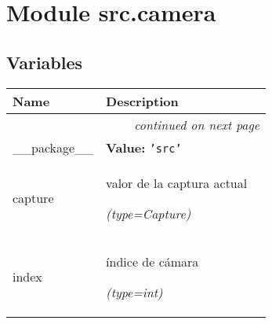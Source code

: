 %
%
%


\section{Module src.camera}

    \label{src:camera}


  \subsection{Variables}

    \vspace{-1cm}
\hspace{\varindent}\begin{longtable}{|p{\varnamewidth}|p{\vardescrwidth}|l}
\cline{1-2}
\cline{1-2} \centering \textbf{Name} & \centering \textbf{Description}& \\
\cline{1-2}
\endhead\cline{1-2}\multicolumn{3}{r}{\small\textit{continued on next page}}\\\endfoot\cline{1-2}
\endlastfoot\raggedright \_\-\_\-p\-a\-c\-k\-a\-g\-e\-\_\-\_\- & \raggedright \textbf{Value:} 
{\tt \texttt{'}\texttt{src}\texttt{'}}&\\
\cline{1-2}
\raggedright c\-a\-p\-t\-u\-r\-e\- & \raggedright valor de la captura actual

            {\it (type=Capture)}&\\
\cline{1-2}
\raggedright i\-n\-d\-e\-x\- & \raggedright índice de cámara

            {\it (type=int)}&\\
\cline{1-2}
\end{longtable}



